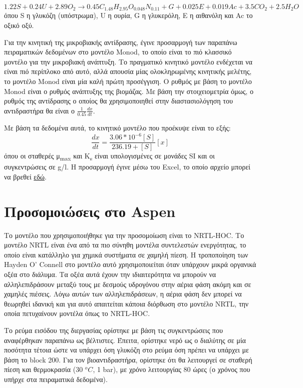 \documentclass[11pt]{article}
\begin{document}
\[ 1.22 S + 0.24U + 2.89 O_2 \rightarrow 0.45 C_{1.48}H_{2.95}O_{0.048}N_{0.11} + G + 0.025E + 0.019Ac + 3.5CO_2 + 2.5H_2O \]
όπου S η γλυκόζη (υπόστρωμα), U η ουρία, G η γλυκερόλη, Ε η αιθανόλη και Ac το οξικό οξύ.

Για την κινητική της μικροβιακής αντίδρασης, έγινε προσαρμογή των παραπάνω πειραματικών δεδομένων στο μοντέλο Monod, το οποίο είναι το πιό κλασσικό μοντέλο για την μικροβιακή ανάπτυξη. Το πραγματικό κινητικό μοντέλο ενδέχεται να είναι πιό περίπλοκο από αυτό, αλλά απουσία μίας ολοκληρωμένης κινητικής μελέτης, το μοντέλο Monod είναι μία καλή πρώτη προσέγγιση. Ο ρυθμός με βάση το μοντέλο Monod είναι ο ρυθμός ανάπτυξης της βιομάζας. Με βάση την στοιχειομετρία όμως, ο ρυθμός της αντίδρασης ο οποίος θα χρησιμοποιηθεί στην διαστασιολόγηση του αντιδραστήρα θα είναι ο \(\frac{1}{0.45} \frac{dx}{dt}\).

Με βάση τα δεδομένα αυτά, το κινητικό μοντέλο που προέκυψε είναι το εξής:
\[ \frac{dx}{dt} = \frac{3.06*10^{-6}[S]}{236.19+[S]}[x] \] όπου οι σταθερές μ\textsubscript{max} και K\textsubscript{s} είναι υπολογισμένες σε μονάδες SI και οι συγκεντρώσεις σε g/l. Η προσαρμογή έγινε μέσω του Excel, το οποίο αρχείο μπορεί να βρεθεί \href{https://github.com/Vidianos-Giannitsis/Process-Design/blob/master/Calculations/c\_glycerinogenes\_kinetics.ods}{εδώ}.

\section{Προσομοιώσεις στο Aspen}
\label{sec:orgcf00b0e}
Το μοντέλο που χρησιμοποιήθηκε για την προσομοίωση είναι το NRTL-HOC. Το μοντέλο NRTL είναι ένα από τα πιο σύνηθη μοντέλα συντελεστών ενεργότητας, το οποίο είναι κατάλληλο για χημικά συστήματα σε χαμηλή πίεση. Η τροποποίηση των Hayden O' Connell στο μοντέλο αυτό χρησιμοποιείται όταν υπάρχουν μικρά οργανικά οξέα στο διάλυμα. Τα οξέα αυτά έχουν την ιδιαιτερότητα να μπορούν να αλληλεπιδράσουν μεταξύ τους με δεσμούς υδρογόνου στην αέρια φάση ακόμη και σε χαμηλές πιέσεις. Λόγω αυτών των αλληλεπιδράσεων, η αέρια φάση δεν μπορεί να θεωρηθεί ιδανική και για αυτό απαιτείται κάποια διόρθωση στο μοντέλο NRTL, την οποία πετυχαίνουν μοντέλα όπως το NRTL-HOC.

Το ρεύμα εισόδου της διεργασίας ορίστηκε με βάση τις συγκεντρώσεις που αναφέρθηκαν παραπάνω ως βέλτιστες. Έπειτα, ορίστηκε νερό ως ο διαλύτης σε μία ποσότητα τέτοια ώστε να υπάρχει όση γλυκόζη στο ρεύμα όση πρέπει να υπάρχει με βάση το block 200. Για τον βιοαντιδραστήρα, ορίστηκε ότι θα λειτουργεί σε σταθερή πίεση και θερμοκρασία (30 \(^oC\), 1 bar), με χρόνο λειτουργίας 80 ώρες (ο χρόνος που υπήρχε στα πειραματικά δεδομένα).
\end{document}
